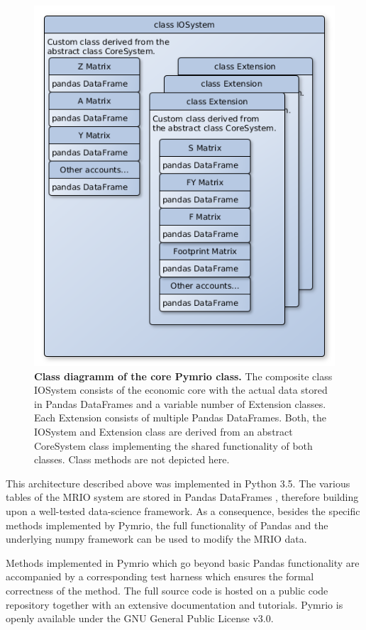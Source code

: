 \documentclass{jors}
\begin{document}
{\begin{figure}[h!]
  \includegraphics[width=.9\textwidth]{./fig/IOSystem.png}
  \caption{\textbf{Class diagramm of the core Pymrio class.}
  The composite class IOSystem consists of the economic core with the actual data stored in Pandas DataFrames and a variable number of Extension classes. Each Extension consists of multiple Pandas DataFrames. Both, the IOSystem and Extension class are derived from an abstract CoreSystem class implementing the shared functionality of both classes. Class methods are not depicted here.}
  \end{figure}

This architecture described above was implemented in Python 3.5.
The various tables of the MRIO system are stored in Pandas DataFrames \cite{mckinney2010}, therefore building upon a well-tested data-science framework.
As a consequence, besides the specific methods implemented by Pymrio, the full functionality of Pandas and the underlying numpy framework \cite{vanderwalt2011} can be used to modify the MRIO data.

Methods implemented in Pymrio which go beyond basic Pandas functionality are accompanied by a corresponding test harness which ensures the formal correctness of the method.
The full source code is hosted on a public code repository \cite{stadler2018a} 
together with an extensive documentation and tutorials.  
Pymrio is openly available under the GNU General Public License v3.0.

}
\end{document}
